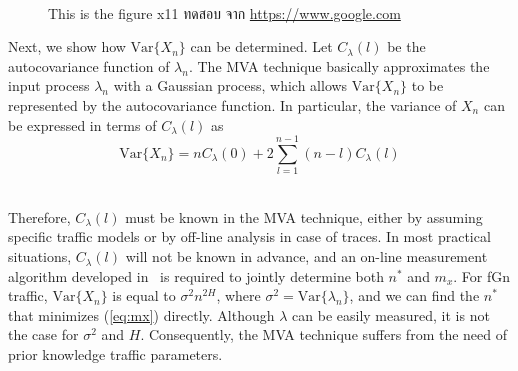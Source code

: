 \documentclass[12pt,oneside,openright,a4paper]{cpe-thai-project}
\begin{document}
 \\


 \begin{figure}[!h]
\caption{This is the figure x11 ทดสอบ จาก \href{https://www.google.com} {https://www.google.com}}\label{fig:x1}
\end{figure}

Next, we show how $\mathrm{Var}\{X_n\}$ can be determined.  Let
$C_{\lambda}(l)$ be the autocovariance function of $\lambda_n$.  The
MVA technique basically approximates the input process $\lambda_n$
with a Gaussian process, which allows $\mathrm{Var}\{X_n\}$ to be
represented by the autocovariance function.  In particular, the
variance of $X_n$ can be expressed in terms of $C_{\lambda}(l)$ as
\begin{equation}
  \mathrm{Var}\{X_n\} = nC_{\lambda}(0) + 2\sum_{l=1}^{n-1} (n-l)C_{\lambda}(l)
\end{equation} 

 \\

Therefore, $C_{\lambda}(l)$ must be known in the MVA technique, either
by assuming specific traffic models or by off-line analysis in case of
traces.  In most practical situations, $C_{\lambda}(l)$ will not be
known in advance, and an on-line measurement algorithm developed
in~\cite{eun01} is required to jointly determine both $n^\ast$ and
$m_x$. For fGn traffic, $\mathrm{Var}\{X_n\}$ is equal to $\sigma^2
n^{2H}$, where $\sigma^2 = \mathrm{Var}\{\lambda_n\}$, and we can find
the $n^\ast$ that minimizes (\ref{eq:mx}) directly. Although $\lambda$
can be easily measured, it is not the case for $\sigma^2$ and $H$.
Consequently, the MVA technique suffers from the need of prior
knowledge traffic parameters. 
\end{document}
